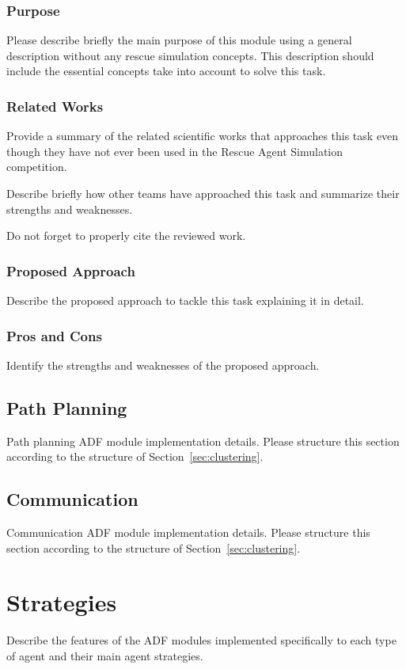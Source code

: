 \documentclass[runningheads,a4paper]{llncs}
\begin{document}
\subsubsection{Purpose}
\label{sec:clustering:purpose}
Please describe briefly the main purpose of this module using a general description without any rescue simulation concepts. This description should include the essential concepts take into account to solve this task.
\subsubsection{Related Works}
\label{sec:clustering:related}
Provide a summary of the related scientific works that approaches this task even though they have not ever been used in the Rescue Agent Simulation competition.

Describe briefly how other teams have approached this task and summarize their strengths and weaknesses.

Do not forget to properly cite the reviewed work.
\subsubsection{Proposed Approach}
\label{sec:clustering:proposed}
Describe the proposed approach to tackle this task explaining it in detail.
\subsubsection{Pros and Cons}
\label{sec:clustering:pros-cons}
Identify the strengths and weaknesses of the proposed approach.
\subsection{Path Planning}
\label{sec:path}
Path planning ADF module implementation details. Please structure this section according to the structure of Section~\ref{sec:clustering}.
\subsection{Communication}
\label{sec:comm}
Communication ADF module implementation details. Please structure this section according to the structure of Section~\ref{sec:clustering}.
\section{Strategies}
\label{sec:strategies}
Describe the features of the ADF modules implemented specifically to each type of agent and their main agent strategies. 
\end{document}
